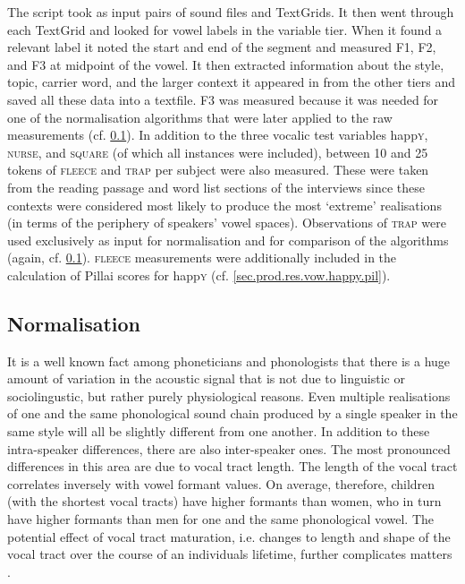 The script took as input pairs of sound files and TextGrids.
It then went through each TextGrid and looked for vowel labels in the variable tier.
When it found a relevant label it noted the start and end of the segment and measured F1, F2, and F3 at midpoint of the vowel.
It then extracted information about the style, topic, carrier word, and the larger context it appeared in from the other tiers and saved all these data into a textfile.
F3 was measured because it was needed for one of the normalisation algorithms that were later applied to the raw measurements (cf. \ref{sec.prod_method.norm}).
In addition to the three vocalic test variables happ\textsc{y}, \textsc{nurse}, and \textsc{square} (of which all instances were included), between 10 and 25 tokens of \textsc{fleece} and \textsc{trap} per subject were also measured.
These were taken from the reading passage and word list sections of the interviews since these contexts were considered most likely to produce the most `extreme' realisations (in terms of the periphery of speakers' vowel spaces).
Observations of \textsc{trap} were used exclusively as input for normalisation and for comparison of the algorithms (again, cf. \ref{sec.prod_method.norm}).
\textsc{fleece} measurements were additionally included in the calculation of Pillai scores for happ\textsc{y} (cf. \ref{sec.prod.res.vow.happy.pil}).

\subsection{Normalisation}\label{sec.prod_method.norm}

It is a well known fact among phoneticians and phonologists that there is a huge amount of variation in the acoustic signal that is not due to linguistic or sociolingustic, but rather purely physiological reasons.
Even multiple realisations of one and the same phonological sound chain produced by a single speaker in the same style will all be slightly different from one another.
In addition to these intra-speaker differences, there are also inter-speaker ones.
The most pronounced differences in this area are due to vocal tract length.
The length of the vocal tract correlates inversely with vowel formant values.
On average, therefore, children (with the shortest vocal tracts) have higher formants than women, who in turn have higher formants than men for one and the same phonological vowel.
The potential effect of vocal tract maturation, i.e. changes to length and shape of the vocal tract over the course of an individuals lifetime, further complicates matters \parencite[cf.][440--441]{harrington2006}.

